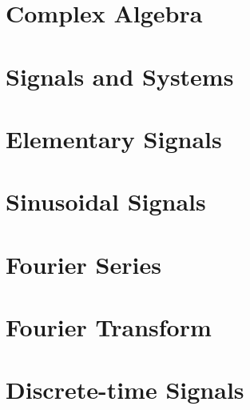 \documentclass{tufte-book}
\begin{document}
\ifSpComplex
\chapter{Complex Algebra}


 \ifSpExerciseSol
 
 \fi
\fi

\ifSpSigSys
\chapter{Signals and Systems}


 \ifSpExerciseSol
 
 \fi
\fi

\ifSpElSig
\chapter{Elementary Signals}


 \ifSpExerciseSol
 
 \fi
\fi

\ifSpSin
\chapter{Sinusoidal Signals}


 \ifSpExerciseSol
 
 \fi
\fi

\ifSpdB

\fi

\ifSpFourierSer
\chapter{Fourier Series}


 \ifSpExerciseSol
 
 \fi



\fi

\ifSpProgA

\fi

\ifSpFourierTra
\chapter{Fourier Transform}


 \ifSpExerciseSol
 
 \fi


\fi

\ifSpDT
\chapter{Discrete-time Signals}


 \ifSpExerciseSol
 
 \fi
\fi
\end{document}
